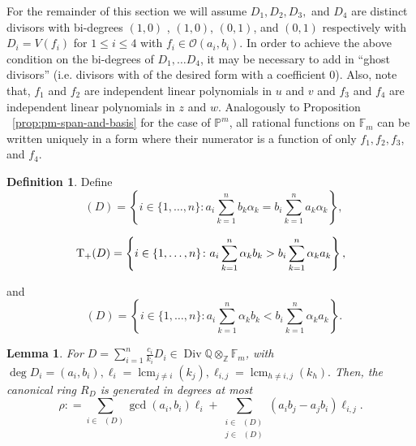 \documentclass{amsart}
\theoremstyle{plain}
\newtheorem{lem}[thm]{Lemma}
\theoremstyle{definition}
\newtheorem{defn}[thm]{Definition}
\theoremstyle{remark}
\numberwithin{equation}{section}
\newcommand\bq{{\mathbb Q}}
\newcommand\bp{{\mathbb P}}
\newcommand\bz{{\mathbb Z}}
\newcommand\sco{{\mathscr O}}
\DeclareMathOperator\di{Div}
\newcommand\bida{a}
\newcommand\bidb{b}
\newcommand\hirz{\mathbb{F}}
\DeclareMathOperator{\Te}{T_=}
\DeclareMathOperator{\Tp}{T_+}
\DeclareMathOperator{\Tm}{T_-}
\DeclareMathOperator{\lcm}{lcm}
\begin{document}
For the remainder of this section we will assume $D_1, D_2, D_3,$ and $D_4$ are
distinct divisors with bi-degrees $(1,0)$
, $(1,0)$, $(0,1)$, and $(0,1)$ respectively with $D_i = V(f_i)$ for $1 \leq i \leq 4$ with $f_i \in \sco(\bida_i, \bidb_i)$.  
In order to achieve the above condition on the bi-degrees of
$D_1, \ldots D_4$, it may be necessary to add in ``ghost divisors'' (i.e.
divisors with of the desired form with a coefficient $0$).
Also, note that, $f_1$ and $f_2$ are independent linear
polynomials in $u$ and $v$ and $f_3$ and $f_4$ are independent
linear polynomials in $z$ and $w$.
Analogously to Proposition ~\ref{prop:pm-span-and-basis} for the case
of $\bp^m$, all rational functions on $\hirz_m$
can be written uniquely in a form where their numerator is a function
of only $f_1,f_2,f_3$, and $f_4$.

\begin{defn}
Define 
\begin{equation*}
	\Te(D) = \left\{i \in \{1, \ldots, n\}: \bida_i \sum_{k=1}^n \bidb_k 
\alpha_k = \bidb_i \sum_{k=1}^n \bida_k \alpha_k \right\},
\end{equation*}

\begin{equation*}
	\Tp(D) = \left\{ i \in \{1, \ldots, n\}\colon  \vphantom{\sum_{k = 1}^n} 
	\bida_i \sum_{k = 1}^n \alpha_k \bidb_k > \bidb_i \sum_{k = 1}^n \alpha_k \bida_k 
\right\},
\end{equation*}

\noindent
and
\begin{equation*}
	\Tm(D) = \left\{ i \in \{1, \ldots, n\}\colon \bida_i \sum_{k = 1}^n \alpha_k
	\bidb_k < \bidb_i \sum_{k=1}^n \alpha_k \bida_k \right\}.
\end{equation*}
\end{defn}

\begin{lem}
\label{lem:hirz-generators}
For $D = \sum_{i=1}^{n} \frac{c_i}{k_i}D_i \in \di \bq \otimes_\bz \hirz_m$, with $\deg D_i = (\bida_i, \bidb_i), \ell_i = \lcm_{j\neq i} (k_j), \ell_{i,j} = \lcm_{h \neq i,j} (k_h).$ Then, the canonical ring $R_D$ is generated in degrees at most
\begin{equation}\label{eqn:def-sigma}
	\rho \colon = \sum_{i \in \Te(D)} \gcd(\bida_i, \bidb_i) \ell_i + \sum_{\substack
	{i \in \Tp(D) \\ j\in \Tm(D)}} (\bida_i \bidb_j - \bida_j \bidb_i)
	\ell	_{i,j}.
\end{equation}
\end{lem}
\end{document}
